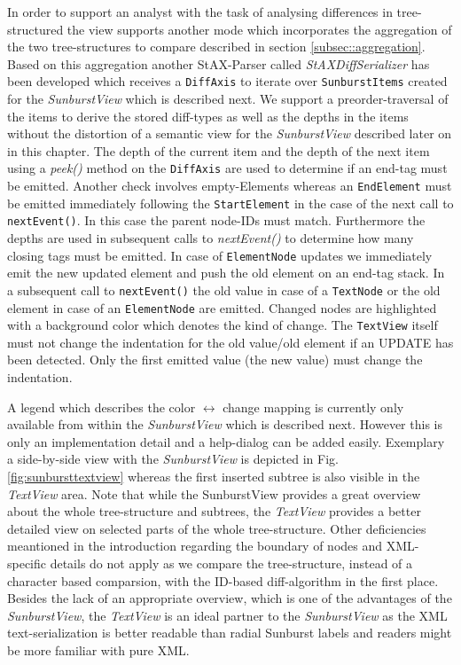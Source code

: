 \begin{itemize}
In order to support an analyst with the task of analysing differences in tree-structured the view supports another mode which incorporates the aggregation of the two tree-structures to compare described in section \ref{subsec::aggregation}. Based on this aggregation another StAX-Parser called \emph{StAXDiffSerializer} has been developed which receives a \texttt{DiffAxis} to iterate over \texttt{SunburstItems} created for the \emph{SunburstView} which is described next. We support a preorder-traversal of the items to derive the stored diff-types as well as the depths in the items without the distortion of a semantic view for the \emph{SunburstView} described later on in this chapter. The depth of the current item and the depth of the next item using a \emph{peek()} method on the \texttt{DiffAxis} are used to determine if an end-tag must be emitted. Another check involves empty-Elements whereas an \texttt{EndElement} must be emitted immediately following the \texttt{StartElement} in the case of the next call to \texttt{nextEvent()}. In this case the parent node-IDs must match. Furthermore the depths are used in subsequent calls to \emph{nextEvent()} to determine how many closing tags must be emitted. In case of \texttt{ElementNode} updates we immediately emit the new updated element and push the old element on an end-tag stack. In a subsequent call to \texttt{nextEvent()} the old value in case of a \texttt{TextNode} or the old element in case of an \texttt{ElementNode} are emitted. Changed nodes are highlighted with a background color which denotes the kind of change. The \texttt{TextView} itself must not change the indentation for the old value/old element if an UPDATE has been detected. Only the first emitted value (the new value) must change the indentation. 

A legend which describes the color $\leftrightarrow$ change mapping is currently only available from within the \emph{SunburstView} which is described next. However this is only an implementation detail and a help-dialog can be added easily. Exemplary a side-by-side view with the \emph{SunburstView} is depicted in Fig. \ref{fig:sunbursttextview} whereas the first inserted subtree is also visible in the \emph{TextView} area. Note that while the SunburstView provides a great overview about the whole tree-structure and subtrees, the \emph{TextView} provides a better detailed view on selected parts of the whole tree-structure. Other deficiencies meantioned in the introduction regarding the boundary of nodes and XML-specific details do not apply as we compare the tree-structure, instead of a character based comparsion, with the ID-based diff-algorithm in the first place. Besides the lack of an appropriate overview, which is one of the advantages of the \emph{SunburstView}, the \emph{TextView} is an ideal partner to the \emph{SunburstView} as the XML text-serialization is better readable than radial Sunburst labels and readers might be more familiar with pure XML.


\end{itemize}
